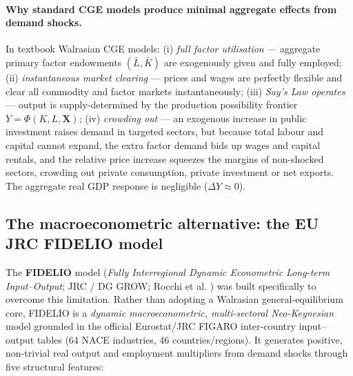 \paragraph{Why standard CGE models produce minimal aggregate effects from demand shocks.}
In textbook Walrasian CGE models: (i) \emph{full factor utilisation} ---
aggregate primary factor endowments $(\bar L, \bar K)$ are exogenously given
and fully employed; (ii) \emph{instantaneous market clearing} --- prices and
wages are perfectly flexible and clear all commodity and factor markets
instantaneously; (iii) \emph{Say's Law operates} --- output is
supply-determined by the production possibility frontier
$Y = \Phi(K, L, \mathbf{X})$; (iv) \emph{crowding out} --- an exogenous increase
in public investment raises demand in targeted sectors, but because total
labour and capital cannot expand, the extra factor demand bids up wages and
capital rentals, and the relative price increase squeezes the margins of
non-shocked sectors, crowding out private consumption, private investment or
net exports. The aggregate real GDP response is negligible
($\Delta Y \approx 0$).

\subsection{The macroeconometric alternative: the EU JRC FIDELIO model}\label{app:fidelio}

The \textbf{FIDELIO} model (\emph{Fully Interregional Dynamic Econometric
Long-term Input--Output}; JRC / DG GROW; Rocchi et al. \citep{Rocchi.2019, Rocchi.2025}) was built
specifically to overcome this limitation. Rather than adopting a Walrasian
general-equilibrium core, FIDELIO is a \emph{dynamic macroeconometric,
multi-sectoral Neo-Keynesian} model grounded in the official Eurostat/JRC
FIGARO inter-country input--output tables (64 NACE industries, 46
countries/regions). It generates positive, non-trivial real output and
employment multipliers from demand shocks through five structural features:

